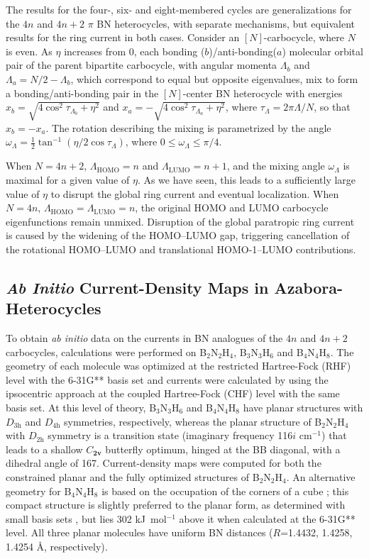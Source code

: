 The results for the four-, six- and eight-membered cycles are generalizations for the $4n$ and $4n+2$ $\pi$ BN heterocycles, with
separate mechanisms, but equivalent results for the ring current in both cases. Consider an $[N]$-carbocycle, where $N$ is even.
As $\eta$ increases from 0, each bonding ($b$)/anti-bonding($a$) molecular orbital pair of the parent bipartite carbocycle, with angular
momenta $\Lambda_{b}$ and $\Lambda_{a}=N/2 - \Lambda_{b}$, which correspond to equal but opposite eigenvalues, mix to form a 
bonding/anti-bonding pair in the $[N]$-center BN heterocycle with energies $x_b = \sqrt{4\cos^{2}\tau_{\Lambda_b}+\eta^2}$ and
$x_a = -\sqrt{4\cos^2 \tau_{\Lambda_{a}}+\eta^2}$, where $\tau_\Lambda=2\pi\Lambda/N$, so that $x_b=-x_a$. The rotation describing the
mixing is parametrized by the angle $\omega_\Lambda=\frac{1}{2}\tan^{-1}(\eta/2\cos\tau_\Lambda)$, where $0 \le \omega_\Lambda \le \pi/4$.

When $N=4n+2$, $\Lambda_\mathrm{HOMO}=n$ and $\Lambda_\mathrm{LUMO}=n+1$, and the mixing angle $\omega_\Lambda$ is maximal for a given
value of $\eta$. As we have seen, this leads to a sufficiently large value of $\eta$ to disrupt the global ring current and eventual
localization. When $N=4n$, $\Lambda_\mathrm{HOMO}=\Lambda_\mathrm{LUMO}=n$, the original HOMO and LUMO carbocycle eigenfunctions remain
unmixed. Disruption of the global paratropic ring current is caused by the widening of the HOMO--LUMO gap, triggering cancellation of
the rotational HOMO--LUMO and translational \mbox{HOMO-1}--LUMO contributions.

\subsection{\textit{Ab Initio} Current-Density Maps in Azabora-Heterocycles}

To obtain \textit{ab initio} data on the currents in BN analogues of the $4n$ and $4n+2$ carbocycles, calculations were performed on B$_2$N$_2$H$_4$,
B$_3$N$_3$H$_6$ and B$_4$N$_4$H$_8$. The geometry of each molecule was optimized at the restricted Hartree-Fock (RHF) level with the 
6-31G** basis set and currents were calculated by using the ipsocentric approach at the coupled Hartree-Fock (CHF) level with the same
basis set. At this level of theory, B$_3$N$_3$H$_6$ and B$_4$N$_4$H$_8$ have planar structures with $D_\mathrm{3h}$ and $D_\mathrm{4h}$ symmetries,
respectively, whereas the planar structure of B$_2$N$_2$H$_4$ with $D_\mathrm{2h}$ symmetry is a transition state (imaginary frequency 116$i$
cm$^{-1}$) that leads to a shallow $C_\mathbf{2v}$ butterfly optimum, hinged at the BB diagonal, with a dihedral angle of 167\degrees.
Current-density maps were computed for both the constrained planar and the fully optimized structures of B$_2$N$_2$H$_4$. An alternative
geometry for B$_4$N$_4$H$_8$ is based on the occupation of the corners of a cube \cite{r25a}; this compact structure is slightly preferred
to the planar form, as determined with small basis sets \cite{r25b}, but lies 302 \mbox{kJ mol$^{-1}$} above it when calculated at the 6-31G**
level. All three planar molecules have uniform BN distances ($R$=1.4432, 1.4258, 1.4254 \AA, respectively).

